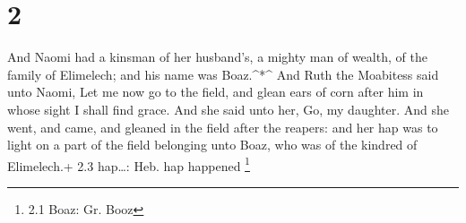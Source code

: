\hypertarget{section-1}{%
\section{2}\label{section-1}}

 And Naomi had a kinsman of her husband's, a mighty man of
wealth, of the family of Elimelech; and his name was Boaz.\^{}*\^{}
 And Ruth the Moabitess said unto Naomi, Let me now go to
the field, and glean ears of corn after him in whose sight I shall find
grace. And she said unto her, Go, my daughter.  And she
went, and came, and gleaned in the field after the reapers: and her hap
was to light on a part of the field belonging unto Boaz, who was of the
kindred of Elimelech.+ 2.3 hap\ldots: Heb. hap happened \footnote{2.1
  Boaz: Gr. Booz}


